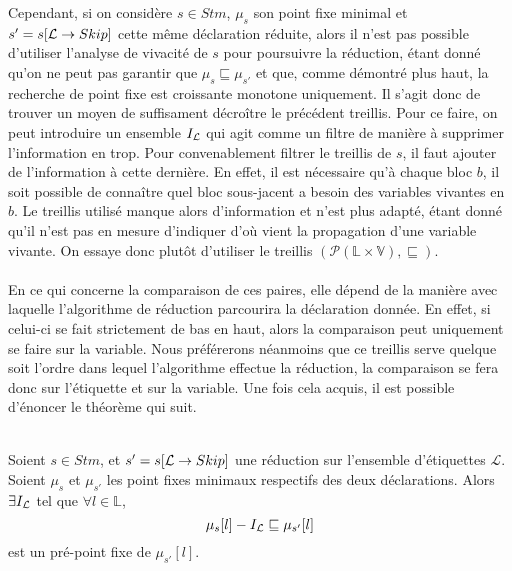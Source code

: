 \documentclass[a4paper, 12pt]{article}
\begin{document}
Cependant, si on considère $s \in Stm$, $\mu_s$ son point fixe minimal et $s' = s[\mathcal{L} \rightarrow{Skip}]$ cette même déclaration
réduite, alors il n'est pas possible d'utiliser l'analyse de vivacité de $s$ pour poursuivre la réduction, étant donné qu'on ne peut pas garantir que
$\mu_{s} \sqsubseteq \mu_{s'}$ et que, comme démontré plus haut, la recherche de point fixe est croissante monotone uniquement. 
Il s'agit donc de trouver un moyen de suffisament décroître le précédent treillis.
Pour ce faire, on peut introduire un ensemble $I_{\mathcal{L}}$ qui agit comme un filtre de manière à supprimer l'information en trop. 
Pour convenablement filtrer le treillis de $s$, il faut ajouter de l'information à cette dernière. 
En effet, il est nécessaire qu'à chaque bloc $b$, il soit possible de connaître quel bloc sous-jacent
a besoin des variables vivantes en $b$. Le treillis utilisé manque alors d'information et n'est plus adapté, étant donné qu'il n'est pas en mesure
d'indiquer d'où vient la propagation d'une variable vivante. On essaye donc plutôt d'utiliser le treillis $(\mathcal{P}(\mathbb{L} \times \mathbb{V}), \sqsubseteq)$. 
\\
\\
En ce qui concerne la comparaison de ces paires, elle dépend de la manière avec laquelle l'algorithme de réduction parcourira la déclaration donnée.
En effet, si celui-ci se fait strictement de bas en haut, alors la comparaison peut uniquement se faire sur la variable. Nous préférerons néanmoins
que ce treillis serve quelque soit l'ordre dans lequel l'algorithme effectue la réduction, la comparaison se fera donc sur l'étiquette
et sur la variable. Une fois cela acquis, il est possible d'énoncer le théorème qui suit.
\\
\\
\begin{theorem}
	Soient $s \in Stm$, et $s' = s[\mathcal{L} \rightarrow{Skip}]$ une réduction sur
	l'ensemble d'étiquettes $\mathcal{L}$. Soient $\mu_s$ et $\mu_{s'}$ les point fixes minimaux respectifs
	des deux déclarations.
	Alors $\exists I_{\mathcal{L}}$ tel que $\forall l \in \mathbb{L}$,
	\[
		\mu_s[l] - I_{\mathcal{L}} \sqsubseteq \mu_{s'}[l]
	\]
	est un pré-point fixe de $\mu_{s'}[l]$.
\end{theorem}
\\
\\
\end{document}
